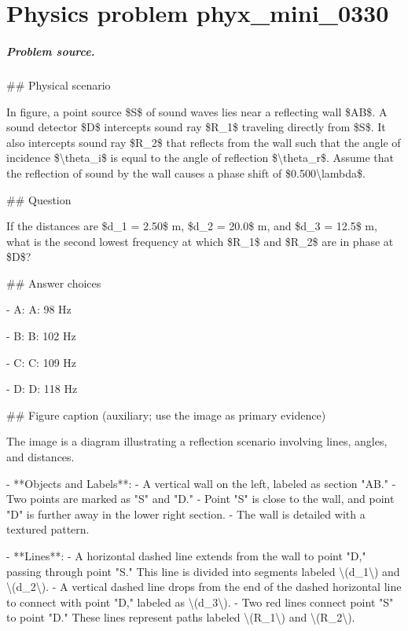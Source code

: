 
\chapter{Physics problem phyx\_mini\_0330}
\label{ch:PhyXMiniProblems_problem_phyx_mini_0330}

\paragraph{Problem source.}
\#\# Physical scenario

In figure, a point source \$S\$ of sound waves lies near a reflecting wall \$AB\$. A sound detector \$D\$ intercepts sound ray \$R\_1\$ traveling directly from \$S\$. It also intercepts sound ray \$R\_2\$ that reflects from the wall such that the angle of incidence \$\textbackslash{}theta\_i\$ is equal to the angle of reflection \$\textbackslash{}theta\_r\$. Assume that the reflection of sound by the wall causes a phase shift of \$0.500\textbackslash{}lambda\$.

\#\# Question

If the distances are \$d\_1 = 2.50\$ m, \$d\_2 = 20.0\$ m, and \$d\_3 = 12.5\$ m, what is the second lowest frequency at which \$R\_1\$ and \$R\_2\$ are in phase at \$D\$?

\#\# Answer choices

- A: A: 98 Hz

- B: B: 102 Hz

- C: C: 109 Hz

- D: D: 118 Hz

\#\# Figure caption (auxiliary; use the image as primary evidence)

The image is a diagram illustrating a reflection scenario involving lines, angles, and distances. 

- **Objects and Labels**:
  - A vertical wall on the left, labeled as section "AB."
  - Two points are marked as "S" and "D." 
  - Point "S" is close to the wall, and point "D" is further away in the lower right section.
  - The wall is detailed with a textured pattern.

- **Lines**:
  - A horizontal dashed line extends from the wall to point "D," passing through point "S." This line is divided into segments labeled \textbackslash{}(d\_1\textbackslash{}) and \textbackslash{}(d\_2\textbackslash{}).
  - A vertical dashed line drops from the end of the dashed horizontal line to connect with point "D," labeled as \textbackslash{}(d\_3\textbackslash{}).
  - Two red lines connect point "S" to point "D." These lines represent paths labeled \textbackslash{}(R\_1\textbackslash{}) and \textbackslash{}(R\_2\textbackslash{}).

